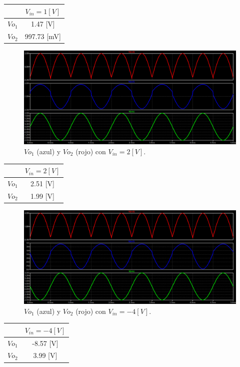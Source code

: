 \begin{center}
	\begin{tabular}{| c | c |}
		\hline
		& $V_{in}= 1[V]$ \\ \hline
		$Vo_1$ 	&  	  1.47 [V]	 \\
		$Vo_2$ 	& 	997.73 [mV]	 \\ \hline
	\end{tabular}
\end{center}
\begin{figure}[H]
	\centering
	\includegraphics[width=1\textwidth]{figuras/Vo1_Vo2_Vin=2.png}
	\caption{$Vo_1$ (azul) y $Vo_2$ (rojo) con $V_{in}=2[V]$.}
\end{figure}
\begin{center}
	\begin{tabular}{| c | c |}
		\hline
		& $V_{in}= 2[V]$ \\ \hline
		$Vo_1$ 	&  	2.51 [V]	 \\
		$Vo_2$ 	& 	1.99 [V]	 \\ \hline
	\end{tabular}
\end{center}
\begin{figure}[H]
	\centering
	\includegraphics[width=1\textwidth]{figuras/Vo1_Vo2_Vin=-4.png}
	\caption{$Vo_1$ (azul) y $Vo_2$ (rojo) con $V_{in}=-4[V]$.}
\end{figure}
\begin{center}
	\begin{tabular}{| c | c |}
		\hline
		& $V_{in}= -4[V]$ \\ \hline
		$Vo_1$ 	&  	-8.57 [V]	 \\
		$Vo_2$ 	& 	 3.99 [V]	 \\ \hline
	\end{tabular}
\end{center}
